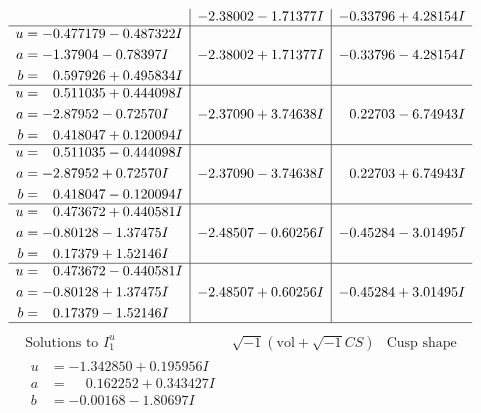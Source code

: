 \documentclass[1p]{elsarticle_modified}
\theoremstyle{definition}
\newcommand{\I}{\sqrt{-1}}
\begin{document}
$$\begin{array}{c|c|c}
 & -2.38002 - 1.71377 I & -0.33796 + 4.28154 I \\ \hline\begin{aligned}
u &= -0.477179 - 0.487322 I \\
a &= -1.37904 - 0.78397 I \\
b &= \phantom{-}0.597926 + 0.495834 I\end{aligned}
 & -2.38002 + 1.71377 I & -0.33796 - 4.28154 I \\ \hline\begin{aligned}
u &= \phantom{-}0.511035 + 0.444098 I \\
a &= -2.87952 - 0.72570 I \\
b &= \phantom{-}0.418047 + 0.120094 I\end{aligned}
 & -2.37090 + 3.74638 I & \phantom{-}0.22703 - 6.74943 I \\ \hline\begin{aligned}
u &= \phantom{-}0.511035 - 0.444098 I \\
a &= -2.87952 + 0.72570 I \\
b &= \phantom{-}0.418047 - 0.120094 I\end{aligned}
 & -2.37090 - 3.74638 I & \phantom{-}0.22703 + 6.74943 I \\ \hline\begin{aligned}
u &= \phantom{-}0.473672 + 0.440581 I \\
a &= -0.80128 - 1.37475 I \\
b &= \phantom{-}0.17379 + 1.52146 I\end{aligned}
 & -2.48507 - 0.60256 I & -0.45284 - 3.01495 I \\ \hline\begin{aligned}
u &= \phantom{-}0.473672 - 0.440581 I \\
a &= -0.80128 + 1.37475 I \\
b &= \phantom{-}0.17379 - 1.52146 I\end{aligned}
 & -2.48507 + 0.60256 I & -0.45284 + 3.01495 I\\
 \hline 
 \end{array}$$\newpage$$\begin{array}{c|c|c}  
\text{Solutions to }I^u_{1}& \I (\text{vol} + \sqrt{-1}CS) & \text{Cusp shape}\\
 \hline 
\begin{aligned}
u &= -1.342850 + 0.195956 I \\
a &= \phantom{-}0.162252 + 0.343427 I \\
b &= -0.00168 - 1.80697 I\end{aligned}

\end{array}$$
\end{document}
